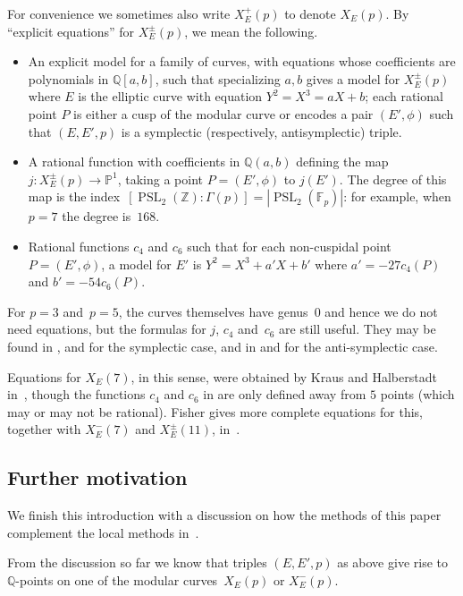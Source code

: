 \documentclass[twoside,leqno,symbols-for-thanks, draft]{rmi}
\numberwithin{equation}{section}
\newcommand{\Fp}{\mathbb{F}_p}
\newcommand{\PP}{\mathbb{P}}
\newcommand{\Q}{\mathbb{Q}}
\newcommand{\Z}{\mathbb{Z}}
\newcommand{\PSL}{\operatorname{PSL}}
\theoremstyle{remark}
\begin{document}
For convenience 
we sometimes also write $X_E^+(p)$ to denote $X_E(p)$. 
By ``explicit equations'' for $X_E^{\pm}(p)$, we mean the
following.
\begin{itemize}
  \item An explicit model for a family of curves, with equations whose
    coefficients are polynomials in $\Q[a,b]$, such that specializing
    $a,b$ gives a model for $X_E^{\pm}(p)$ where $E$ is the elliptic
    curve with equation $Y^2=X^3=aX+b$; each rational point $P$ is
    either a cusp of the modular curve or encodes a pair $(E',\phi)$
    such that $(E,E', p)$ is a symplectic (respectively,
    antisymplectic) triple.
    \item A rational function with coefficients in $\Q(a,b)$ defining
      the map $j: X_E^{\pm}(p) \to \PP^1$, taking a point
      $P=(E',\phi)$ to $j(E')$.  The degree of this map is the
      index~$[\PSL_2(\Z):\Gamma(p)] = |\PSL_2(\Fp)|$: for example, when
        $p=7$ the degree is~$168$.
      \item Rational functions $c_4$ and $c_6$ such that for each
        non-cuspidal point~$P=(E',\phi)$, a model for $E'$ is $Y^2 =
        X^3+a'X+b'$ where $a' = -27c_4(P)$ and $b' = -54c_6(P)$.
\end{itemize}
For $p=3$ and~$p=5$, the curves themselves have genus~$0$ and hence we
do not need equations, but the formulas for $j$, $c_4$ and~$c_6$ are
still useful.  They may be found in \cite{Rubin-Silverberg},
\cite{Rubin-Silverberg2} and \cite{Silverberg} for the symplectic
case, and in \cite{FisherHessian} and \cite{FisherQuintic} for the
anti-symplectic case.

Equations for $X_E(7)$, in this sense, were obtained by Kraus and
Halberstadt in~\cite{Halberstadt-Kraus-XE7}, though the functions
$c_4$ and $c_6$ in \cite{Halberstadt-Kraus-XE7} are only defined away
from $5$ points (which may or may not be rational). Fisher gives more
complete equations for this, together with $X_E^-(7)$ and
$X_E^{\pm}(11)$, in~\cite{Fisher}.


\subsection{Further motivation} \label{S:motivation}
We finish this introduction with a discussion on how the methods of
this paper complement the local methods in~\cite{FKSym}.

From the discussion so far we know that triples $(E,E',p)$ as above
give rise to $\Q$-points on one of the modular curves~$X_E(p)$ or $X_E^-(p)$. 
\end{document}
